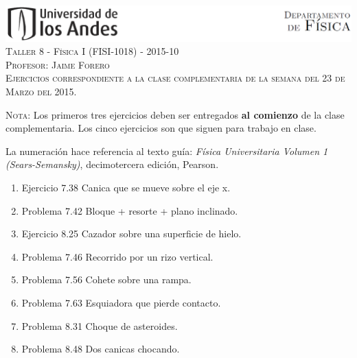 \documentclass[letterpaper,10pt,onecolumn]{article}
\begin{document}
\begin{center}

\includegraphics[width=490pt]{figs/header.png}\\[0.5cm]

\textsc{\LARGE Taller 8 - F\'isica I (FISI-1018) - 2015-10}\\[0.5cm]

\textsc{\Large{Profesor: Jaime Forero}} \\[0.5cm]

\noindent\textsc{Ejercicios correspondiente a la clase complementaria
  de la semana del 23 de Marzo del 2015.}\\[0.5cm]
\end{center}

\noindent\textsc{Nota:} Los primeros tres ejercicios deben ser
entregados {\bf al comienzo} de la clase complementaria.  Los cinco ejercicios son que siguen para trabajo en clase.   

La numeraci\'on hace referencia al texto
gu\'ia: \textit{F\'isica Universitaria Volumen  1 (Sears-Semansky)},
decimotercera edici\'on, Pearson. 

\begin{enumerate}
\item Ejercicio 7.38 Canica que se mueve sobre el eje x.
\item Problema 7.42 Bloque + resorte + plano inclinado.
\item Ejercicio 8.25 Cazador sobre una superficie de hielo.
\item Problema 7.46 Recorrido por un rizo vertical.
\item Problema 7.56 Cohete sobre una rampa.
\item Problema 7.63 Esquiadora que pierde contacto.
\item Problema 8.31 Choque de asteroides. 
\item Problema 8.48 Dos canicas chocando.
\end{enumerate}
\end{document}
